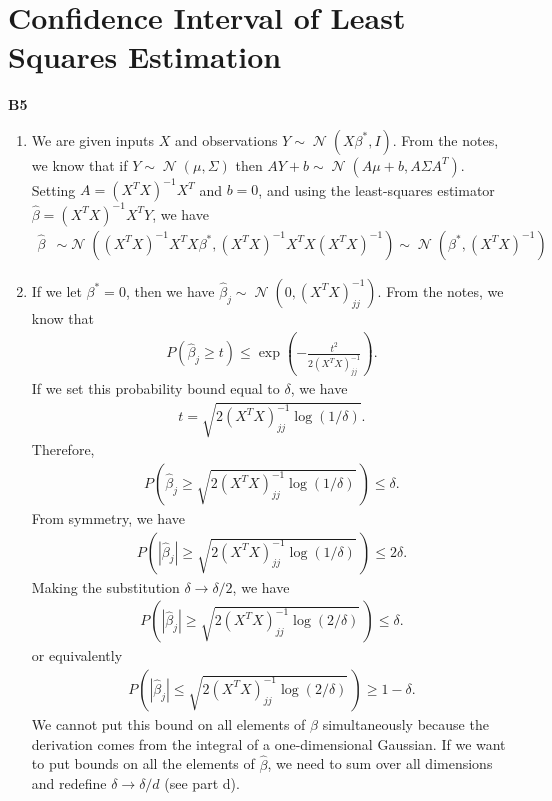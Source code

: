 \documentclass{article}
\DeclareMathOperator{\N}{\mathcal{N}}
\begin{document}
\section*{Confidence Interval of Least Squares Estimation}

\textbf{B5}

\begin{enumerate}
        \item We are given inputs $X$ and observations $Y \sim \N(X\beta^*, I)$.
        From the notes, we know that if $Y \sim \N(\mu, \Sigma)$ then $AY + b \sim \N(A\mu + b, A \Sigma A^T)$.
        Setting $A = (X^T X)^{-1} X^T$ and $b=0$, and using the least-squares estimator $\hat{\beta} = (X^T X)^{-1} X^T Y$, we have
        \begin{align*}
                \hat{\beta} &\sim \N((X^T X)^{-1} X^T X \beta^*, (X^T X)^{-1} X^T X (X^T X)^{-1}) \sim \N(\beta^*, (X^T X)^{-1})
        \end{align*}
        
        \item 
        If we let $\beta^* = 0$, then we have $\hat{\beta}_j \sim \N(0,(X^T X)_{jj}^{-1})$.
        From the notes, we know that 
        \begin{align*}
                P(\hat{\beta}_j \geq t) \leq \exp \left( -\frac{t^2}{2(X^T X)_{jj}^{-1}} \right).
        \end{align*}
        If we set this probability bound equal to $\delta$, we have
        \begin{align*}
                t = \sqrt{2 (X^T X)_{jj}^{-1} \log(1/\delta)}.
        \end{align*}
        Therefore,
        \begin{align*}
                P \left( \hat{\beta}_j \geq \sqrt{2 (X^T X)_{jj}^{-1} \log(1/\delta)} \, \right) \leq \delta.
        \end{align*}
        From symmetry, we have
        \begin{align*}
                P \left( |\hat{\beta}_j| \geq \sqrt{2 (X^T X)_{jj}^{-1} \log(1/\delta)} \, \right) \leq 2\delta.
        \end{align*}
        Making the substitution $\delta \to \delta/2$, we have
        \begin{align*}
                P \left( |\hat{\beta}_j| \geq \sqrt{2 (X^T X)_{jj}^{-1} \log(2/\delta)} \, \right) \leq \delta.
        \end{align*}
        or equivalently
        \begin{align*}
                P \left( |\hat{\beta}_j| \leq \sqrt{2 (X^T X)_{jj}^{-1} \log(2/\delta)} \, \right) \geq 1 - \delta.
        \end{align*}
        We cannot put this bound on all elements of $\hat{\beta}$ simultaneously because the derivation comes from the integral of a one-dimensional Gaussian.
        If we want to put bounds on all the elements of $\hat{\beta}$, we need to sum over all dimensions and redefine $\delta \to \delta/d$ (see part d).


\end{enumerate}
\end{document}

